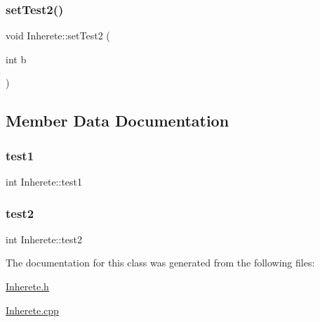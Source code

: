 \hypertarget{class_inherete_ad1f7eeac2bc911bd5746a28648c6a98d}{}\label{class_inherete_ad1f7eeac2bc911bd5746a28648c6a98d} 
\subsubsection{\texorpdfstring{set\+Test2()}{setTest2()}}
{\footnotesize\ttfamily void Inherete\+::set\+Test2 (\begin{DoxyParamCaption}\item[{int}]{b }\end{DoxyParamCaption})}



\subsection{Member Data Documentation}
\hypertarget{class_inherete_a3c7cd588b0f27f922ab4d8ba62150f80}{}\label{class_inherete_a3c7cd588b0f27f922ab4d8ba62150f80} 
\subsubsection{\texorpdfstring{test1}{test1}}
{\footnotesize\ttfamily int Inherete\+::test1\hspace{0.3cm}{\ttfamily [protected]}}

\hypertarget{class_inherete_aab5737b7592b7be0f19d1268d86df269}{}\label{class_inherete_aab5737b7592b7be0f19d1268d86df269} 
\subsubsection{\texorpdfstring{test2}{test2}}
{\footnotesize\ttfamily int Inherete\+::test2\hspace{0.3cm}{\ttfamily [protected]}}



The documentation for this class was generated from the following files\+:\begin{DoxyCompactItemize}
\item 
\hyperlink{_inherete_8h}{Inherete.\+h}\item 
\hyperlink{_inherete_8cpp}{Inherete.\+cpp}\end{DoxyCompactItemize}
